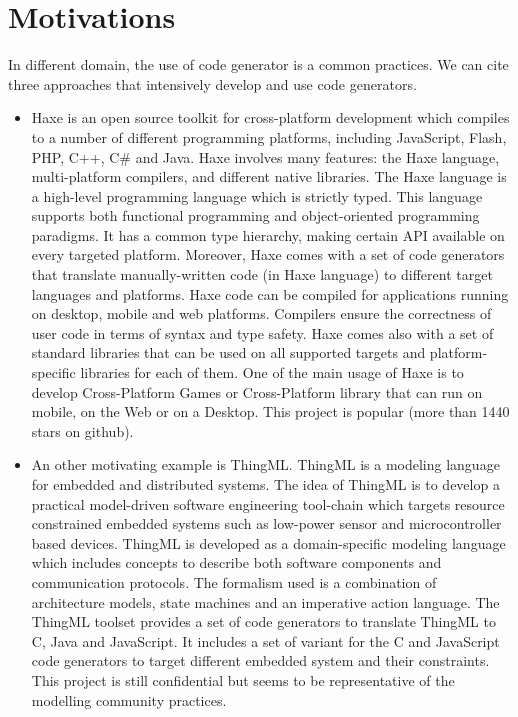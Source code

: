 
\section{Motivations}


In different domain, the use of code generator is a common practices. We can cite three approaches that intensively develop and use code generators. 

\begin{itemize}
\item 	Haxe is an open source toolkit for cross-platform development which compiles to a number of different programming platforms, including JavaScript, Flash, PHP, C++, C\# and Java. Haxe involves many features: the Haxe language, multi-platform compilers, and different native libraries. The Haxe language is a high-level programming language which is strictly typed. This language supports both functional programming and object-oriented programming paradigms. It has a common type hierarchy, making certain API available on every targeted platform. Moreover, Haxe comes with a set of code generators that translate manually-written code (in Haxe language) to different target languages and platforms.  Haxe code can be compiled for applications running on desktop, mobile and web platforms. Compilers ensure the correctness of user code in terms of syntax and type safety. Haxe comes also with a set of standard libraries that can be used on all supported targets and platform-specific libraries for each of them. One of the main usage of Haxe is to develop Cross-Platform Games or Cross-Platform library that can run on mobile, on the Web or on a Desktop.  	This project is popular (more than 1440 stars on github).

\item An other motivating example is ThingML.   ThingML is a modeling language for embedded and distributed systems. The idea of ThingML is to develop a practical model-driven software engineering tool-chain which targets resource constrained embedded systems such as low-power sensor and microcontroller based devices. ThingML is developed as a domain-specific modeling language which includes concepts to describe both software components and communication protocols. The formalism used is a combination of architecture models, state machines and an imperative action language. The ThingML toolset provides a set of code generators  to translate ThingML to C, Java and JavaScript. It includes a set of variant for the C and JavaScript code generators to target different embedded system and their constraints. 
 This project is still confidential but seems to be representative of the modelling community practices.
 

\end{itemize}
